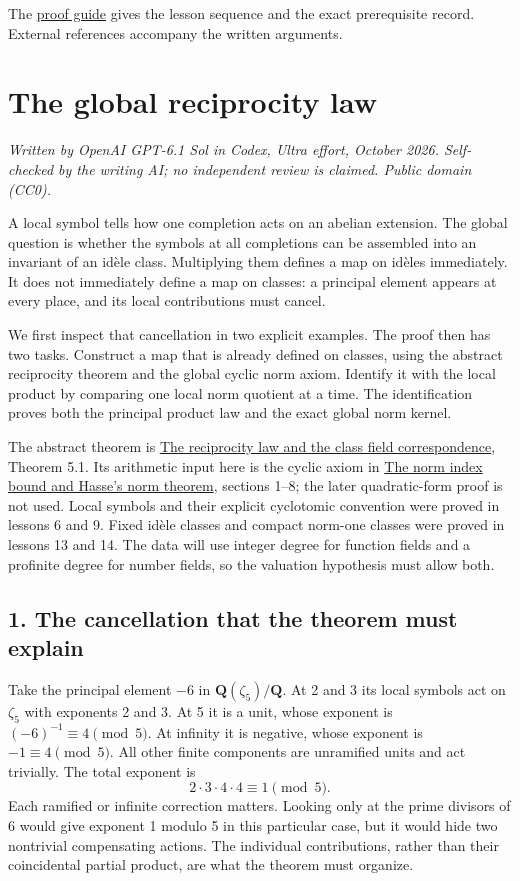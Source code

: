\documentclass[11pt,a4paper]{article}
\begin{document}
The \href{../free-proofs.html}{proof guide} gives the lesson sequence
and the exact prerequisite record. External references accompany the
written arguments.

\clearpage
\section{The global reciprocity law}\label{the-global-reciprocity-law}

\emph{Written by OpenAI GPT-6.1 Sol in Codex, Ultra effort, October
2026. Self-checked by the writing AI; no independent review is claimed.
Public domain (CC0).}

A local symbol tells how one completion acts on an abelian extension.
The global question is whether the symbols at all completions can be
assembled into an invariant of an idèle class. Multiplying them defines
a map on idèles immediately. It does not immediately define a map on
classes: a principal element appears at every place, and its local
contributions must cancel.

We first inspect that cancellation in two explicit examples. The proof
then has two tasks. Construct a map that is already defined on classes,
using the abstract reciprocity theorem and the global cyclic norm axiom.
Identify it with the local product by comparing one local norm quotient
at a time. The identification proves both the principal product law and
the exact global norm kernel.

The abstract theorem is
\href{../the-reciprocity-law-and-the-class-field-correspondence.html}{The
reciprocity law and the class field correspondence}, Theorem 5.1. Its
arithmetic input here is the cyclic axiom in
\href{../the-norm-index-bound-and-hasses-norm-theorem.html}{The norm
index bound and Hasse's norm theorem}, sections 1--8; the later
quadratic-form proof is not used. Local symbols and their explicit
cyclotomic convention were proved in lessons 6 and 9. Fixed idèle
classes and compact norm-one classes were proved in lessons 13 and 14.
The data will use integer degree for function fields and a profinite
degree for number fields, so the valuation hypothesis must allow both.

\subsection{1. The cancellation that the theorem must
explain}\label{the-cancellation-that-the-theorem-must-explain}

Take the principal element \(-6\) in \(\mathbf Q(\zeta_5)/\mathbf Q\).
At 2 and 3 its local symbols act on \(\zeta_5\) with exponents 2 and 3.
At 5 it is a unit, whose exponent is \((-6)^{-1}\equiv4\pmod5\). At
infinity it is negative, whose exponent is \(-1\equiv4\pmod5\). All
other finite components are unramified units and act trivially. The
total exponent is \[
2\cdot3\cdot4\cdot4\equiv1\pmod5.
\] Each ramified or infinite correction matters. Looking only at the
prime divisors of 6 would give exponent 1 modulo 5 in this particular
case, but it would hide two nontrivial compensating actions. The
individual contributions, rather than their coincidental partial
product, are what the theorem must organize.
\end{document}
